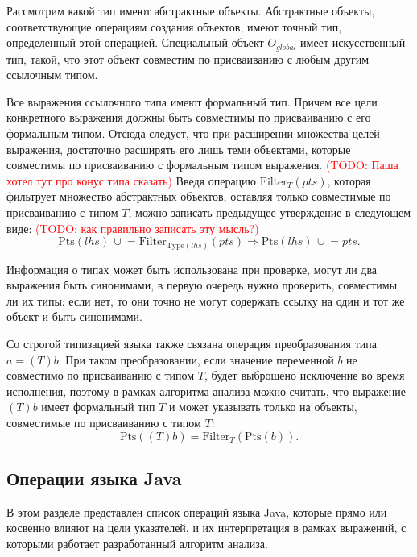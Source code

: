 \documentclass[14pt,titlepage]{extarticle}
\newcommand{\Type}[1]{\textrm{Type}(#1)}
\newcommand{\Pts}[1]{\textrm{Pts}(#1)}
\newcommand{\Filter}[2]{\textrm{Filter}_{#1}(#2)}
\newcommand{\cupe}{\,\cup\!\!=}
\newcommand{\todo}[1]{\textcolor{red}{(\eng{TODO}: #1)}}
\newcommand{\eng}[1]{{\English#1}}
\begin{document}
        Рассмотрим какой тип имеют абстрактные объекты. Абстрактные объекты,
        соответствующие операциям создания объектов, имеют точный тип,
        определенный этой операцией.
        Специальный объект $O_{global}$ имеет искусственный тип, такой, что
        этот объект совместим по присваиванию с любым другим ссылочным типом.

        Все выражения ссылочного типа имеют формальный тип. Причем все цели
        конкретного выражения должны быть совместимы по присваиванию с его
        формальным типом.
        Отсюда следует, что при расширении множества целей выражения,
        достаточно расширять его лишь теми объектами, которые совместимы по
        присваиванию с формальным типом выражения. \todo{Паша хотел тут про
        конус типа сказать}
        Введя операцию $\Filter{T}{pts}$, которая фильтрует множество
        абстрактных объектов, оставляя только совместимые по присваиванию с
        типом $T$, можно записать предыдущее утверждение в следующем виде:
        \todo{как правильно записать эту мысль?}
        \[\Pts{lhs} \cupe \Filter{\Type{lhs}}{pts} \Rightarrow
          \Pts{lhs} \cupe pts.\]

        Информация о типах может быть использована при проверке, могут ли два
        выражения быть синонимами, в первую очередь нужно проверить, совместимы
        ли их типы: если нет, то они точно не могут содержать ссылку на один и
        тот же объект и быть синонимами.

        Со строгой типизацией языка также связана операция преобразования типа
        $a = (T)b$.
        При таком преобразовании, если значение переменной $b$ не совместимо
        по присваиванию с типом $T$, будет выброшено исключение во время
        исполнения, поэтому в рамках алгоритма анализа можно считать, что
        выражение $(T)b$ имеет формальный тип $T$ и может указывать только на
        объекты, совместимые по присваиванию с типом $T$:
        \[\Pts{(T)b} = \Filter{T}{\Pts{b}}.\]

    \subsection{Операции языка Java}
      \label{section:operations}

      В этом разделе представлен список операций языка Java, которые прямо или
      косвенно влияют на цели указателей, и их интерпретация в рамках
      выражений, с которыми работает разработанный алгоритм анализа.
\end{document}
